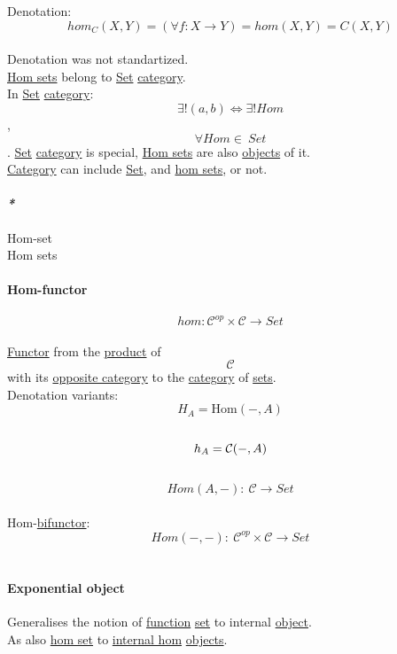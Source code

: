 \documentclass[11pt]{article}
\begin{document}
Denotation:\\
$$ hom_{C}(X,Y) = (\forall f: X \to Y) = hom(X,Y) = C(X,Y) $$\\
Denotation was not standartized.\\

\hyperref[org5b9cf9b]{Hom sets} belong to \hyperref[org1faf06d]{Set} \hyperref[org0450535]{category}.\\

In \hyperref[org1faf06d]{Set} \hyperref[org0450535]{category}: $$ \exists! (a, b) \iff \exists! Hom $$, $$ \forall Hom \in \ Set $$. \hyperref[org1faf06d]{Set} \hyperref[org0450535]{category} is special, \hyperref[org5b9cf9b]{Hom sets} are also \hyperref[org363acc2]{objects} of it.\\

\hyperref[org0450535]{Category} can include \hyperref[org1faf06d]{Set}, and \hyperref[org5b9cf9b]{hom sets}, or not.\\

\paragraph{\emph{*}}
\label{sec:orgaa2fb8c}
\label{org31a866a}Hom-set\\
\label{org5b9cf9b}Hom sets\\

\paragraph{\label{org8cb45a1}Hom-functor}
\label{sec:org9911937}
$$ hom:\mathcal{C}^{op} \times \mathcal{C} \to Set $$\\
\hyperref[orgf2f6841]{Functor} from the \hyperref[org80a0b6e]{product} of $$ \mathcal{C} $$ with its \hyperref[org99d1f00]{opposite category} to the \hyperref[org0450535]{category} of \hyperref[org58ec608]{sets}.\\

Denotation variants:\\
$$ H_A = \mathrm{Hom}(-, A) $$\\
$$ h_A = {\cal \mathcal{C}}(-, A) $$\\
$$ Hom(A,-): \ \mathcal{C} \to Set $$\\

Hom-\hyperref[orgfd5d693]{bifunctor}:\\
$$ Hom(-,-): \ \mathcal{C}^{op} \times \mathcal{C} \to Set $$\\

\paragraph{\label{orge875217}Exponential object}
\label{sec:org30e93d5}
Generalises the notion of \hyperref[orge15bc14]{function} \hyperref[org1faf06d]{set} to internal \hyperref[org4be0e9d]{object}.\\
As also \hyperref[org6f15cb6]{hom set} to \hyperref[org3fb43c1]{internal hom} \hyperref[org363acc2]{objects}.\\
\end{document}
